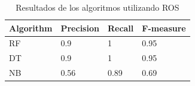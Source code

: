 \begin{table}[H]
\centering
\captionsetup{labelsep=period, labelfont=bf}
\caption{Resultados de los algoritmos utilizando ROS}
\fontsize{12pt}{10pt}\selectfont
\begin{tabular}{llll}
\toprule 
\textbf{Algorithm} & \textbf{Precision} & \textbf{Recall} & \textbf{F-measure} \\ 
\midrule 
RF & 0.9 & 1 & 0.95 \\ 
DT & 0.9 & 1 & 0.95 \\ 
NB & 0.56 & 0.89 & 0.69 \\ 
\bottomrule
\end{tabular}

\label{tab:ros_results}
\end{table}
